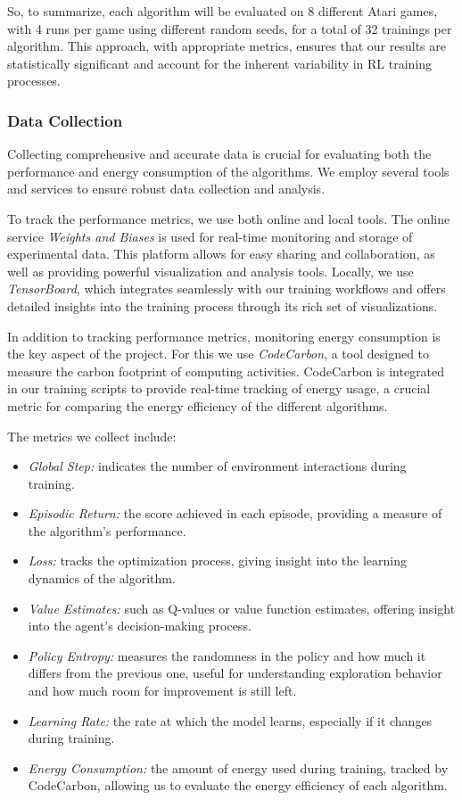 So, to summarize, each algorithm will be evaluated on 8 different Atari games, with 4 runs per game using different random seeds, for a total of 32 trainings per algorithm. This approach, with appropriate metrics, ensures that our results are statistically significant and account for the inherent variability in RL training processes.

\subsubsection{Data Collection}
\label{subsubsec:data_collection}

Collecting comprehensive and accurate data is crucial for evaluating both the performance and energy consumption of the algorithms. We employ several tools and services to ensure robust data collection and analysis.

To track the performance metrics, we use both online and local tools. The online service \textit{Weights and Biases} is used for real-time monitoring and storage of experimental data. This platform allows for easy sharing and collaboration, as well as providing powerful visualization and analysis tools. Locally, we use \textit{TensorBoard}, which integrates seamlessly with our training workflows and offers detailed insights into the training process through its rich set of visualizations.

In addition to tracking performance metrics, monitoring energy consumption is the key aspect of the project. For this we use \textit{CodeCarbon}, a tool designed to measure the carbon footprint of computing activities. CodeCarbon is integrated in our training scripts to provide real-time tracking of energy usage, a crucial metric for comparing the energy efficiency of the different algorithms.

The metrics we collect include:
\begin{itemize}
	\item \textit{Global Step:} indicates the number of environment interactions during training.
	\item \textit{Episodic Return:} the score achieved in each episode, providing a measure of the algorithm's performance.
	\item \textit{Loss:} tracks the optimization process, giving insight into the learning dynamics of the algorithm.
	\item \textit{Value Estimates:} such as Q-values or value function estimates, offering insight into the agent's decision-making process.
	\item \textit{Policy Entropy:} measures the randomness in the policy and how much it differs from the previous one, useful for understanding exploration behavior and how much room for improvement is still left.
	\item \textit{Learning Rate:} the rate at which the model learns, especially if it changes during training.
	\item \textit{Energy Consumption:} the amount of energy used during training, tracked by CodeCarbon, allowing us to evaluate the energy efficiency of each algorithm.
\end{itemize}

